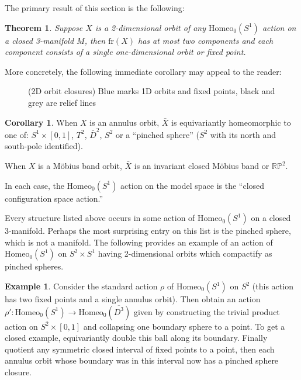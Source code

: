 \documentclass[10pt, oneside]{article}
\newcommand{\RP}{\mathbb{RP}}
\newcommand{\homeo}[1][S^1]{\text{Homeo}_0(#1)}
\newcommand{\cl}[1]{\overline{#1}}
\newtheorem{thm}{Theorem}[section]
\theoremstyle{definition}
\newtheorem{eg}{Example}[section]
\newtheorem{cor}{Corollary}[section]
\theoremstyle{definition}
\begin{document}
The primary result of this section is the following:

\begin{thm}\label{thm:2d-orbit-cpctification}
    Suppose $X$ is a 2-dimensional orbit of any $\homeo$ action on a closed 3-manifold $M$, then $\text{fr}(X)$ has at most two components and each component consists of a single one-dimensional orbit or fixed point.
\end{thm}

More concretely, the following immediate corollary
may appeal to the reader:

\begin{figure}[b]
    \centering
    
    \caption{(2D orbit closures) Blue marks 1D orbits and fixed points, black and grey are relief lines}
    \label{fig:2d-orbit-compactifications}
\end{figure}

\begin{cor}\label{cor:2d-orbit-closures}
    When $X$ is an annulus orbit, $\bar{X}$ is equivariantly homeomorphic to one of: $S^1\times [0,1]$, $T^2$, $\bar{D}^2$, $S^2$ or a ``pinched sphere'' ($S^2$ with its north and south-pole identified).

    When $X$ is a M\"{o}bius band orbit, $\bar{X}$ is an invariant closed M\"{o}bius band or $\RP^2$.

    In each case, the $\homeo$ action on the model space is the ``closed configuration space action.''
\end{cor}

Every structure listed above occurs in some action of $\homeo$ on a closed 3-manifold. Perhaps the most surprising entry on this list is the pinched sphere, which is not a manifold. The following provides an example of an action of $\homeo$ on $S^2 \times S^1$ having 2-dimensional orbits which compactify as pinched spheres.

\begin{eg}
    Consider the standard action $\rho$ of $\homeo[S^1]$ on $S^2$ (this action has two fixed points and a single annulus orbit). Then obtain an action $\rho':\homeo[S^1]\to \homeo[\cl{D^3}]$ given by constructing the trivial product action on $S^2\times [0,1]$ and collapsing one boundary sphere to a point. To get a closed example, equivariantly double this ball along its boundary. Finally quotient any symmetric closed interval of fixed points to a point, then each annulus orbit whose boundary was in this interval now has a pinched sphere closure.
\end{eg}
\end{document}
